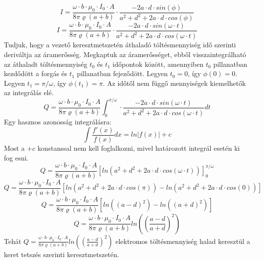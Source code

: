 \documentclass[11pt,a4paper,openany,leqno]{article}
\begin{document}
$$ I = \frac{\omega \cdot b \cdot\mu_0\cdot I_0\cdot A}{8\pi \varrho (a+b)}\cdot \frac{-2a\cdot d \cdot sin(\phi)}{a^2 + d^2 + 2a\cdot d \cdot cos(\phi)} $$
$$ I = \frac{\omega \cdot b \cdot\mu_0\cdot I_0\cdot A}{8\pi \varrho (a+b)}\cdot \frac{-2a\cdot d \cdot sin(\omega \cdot t)}{a^2 + d^2 + 2a\cdot d \cdot cos(\omega \cdot t)} $$\indent
Tudjuk, hogy a vezető keresztmetszetén áthaladó töltésmennyiség idő szerinti deriváltja az áramerősség. Megkaptuk az áramerősséget, ebből visszaintegrálható az áthaladt töltésmennyiség $t_0$ és $t_1$ időpontok között, amennyiben $t_0$ pillanatban kezdődött a forgás és $t_1$ pillanatban fejeződött. Legyen $t_0 = 0$, így $\phi(0) = 0$. Legyen $t_1 = \pi / \omega$, így $\phi(t_1) = \pi $. Az időtől nem függő mennyiségek kiemelhetők az integrálás elé. \\
$$ Q = \frac{\omega \cdot b \cdot\mu_0\cdot I_0\cdot A}{8\pi \varrho (a+b)} \int_{0}^{\pi/\omega} \cdot \frac{-2a\cdot d \cdot sin(\omega \cdot t)}{a^2 + d^2 + 2a\cdot d \cdot cos(\omega \cdot t)} dt $$\indent
Egy hasznos azonosság integrálásra:\\
$$ \int\frac{f'(x)}{f(x)}dx = ln|f(x)| + c $$\indent
Most a $+c$ konstanssal nem kell foglalkozni, mivel határozott integrál esetén ki fog esni.\\
$$ Q = \frac{\omega \cdot b \cdot\mu_0\cdot I_0\cdot A}{8\pi \varrho (a+b)} [ln(a^2 + d^2 + 2a\cdot d \cdot cos(\omega \cdot t))]_0^{\pi/\omega} $$
$$ Q = \frac{\omega \cdot b \cdot\mu_0\cdot I_0\cdot A}{8\pi \varrho (a+b)} [ln(a^2 + d^2 + 2a\cdot d \cdot cos(\pi)) - ln(a^2 + d^2 + 2a\cdot d \cdot cos(0))] $$
$$ Q = \frac{\omega \cdot b \cdot\mu_0\cdot I_0\cdot A}{8\pi \varrho (a+b)} [ln((a-d)^2) - ln((a+d)^2)] $$
$$ Q = \frac{\omega \cdot b \cdot\mu_0\cdot I_0\cdot A}{8\pi \varrho (a+b)} ln((\frac{a-d}{a+d})^2) $$ \indent
Tehát $ Q = \frac{\omega \cdot b \cdot\mu_0\cdot I_0\cdot A}{8\pi \varrho (a+b)} ln((\frac{a-d}{a+d})^2) $ elektromos töltésmennyiség halad keresztül a keret tetszés szerinti keresztmetszetén.
\end{document}
